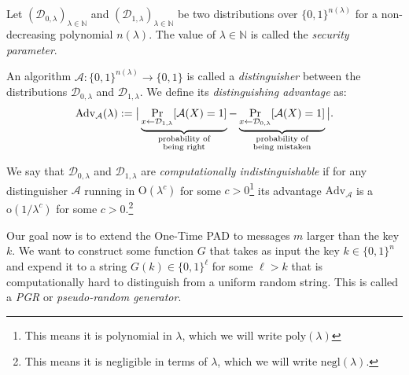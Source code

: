 \documentclass[./main]{subfiles}
\begin{document}
  \begin{defn}
    Let $(\mathcal{D}_{0, \lambda})_{\lambda \in \mathds{N}}$ and $(\mathcal{D}_{1, \lambda})_{\lambda \in \mathds{N}}$ be two distributions over $\{0,1\}^{n(\lambda)}$ for a non-decreasing polynomial $n(\lambda)$.
    The value of $\lambda \in \mathds{N}$ is called the \textit{security parameter}.

    An algorithm $\mathcal{A} : \{0,1\}^{n(\lambda)} \to \{0,1\}$ is called a \textit{distinguisher} between the distributions $\mathcal{D}_{0, \lambda}$ and $\mathcal{D}_{1, \lambda}$. We define its \textit{distinguishing advantage} as:
    \[
      \mathrm{Adv}_\mathcal{A}(\lambda) := \big| \underbrace{\Pr_{x \gets \mathcal{D}_{1, \lambda}} [\mathcal{A}(X) = 1]}_{ \mathclap{\substack{\text{probability of}\\ \text{being right}}} } - \underbrace{\Pr_{x \gets \mathcal{D}_{0, \lambda}} [\mathcal{A}(X) = 1]}_{\mathclap{\substack{\text{probability of}\\ \text{being mistaken}}}} \big|
    .\] 

    We say that $\mathcal{D}_{0, \lambda}$ and $\mathcal{D}_{1, \lambda}$ are \textit{computationally indistinguishable} if for any distinguisher $\mathcal{A}$ running in $\mathrm{O}(\lambda^c)$ for some $c > 0$\footnote{This means it is polynomial in $\lambda$, which we will write $\mathrm{poly}(\lambda)$} its advantage $\mathrm{Adv}_\mathcal{A}$ is a $\mathrm{o}(1 / \lambda^c)$ for some $c > 0$.\footnote{This means it is negligible in terms of $\lambda$, which we will write $\mathrm{negl}(\lambda)$.}
  \end{defn}
  
  Our goal now is to extend the One-Time PAD to messages $m$ larger than the key $k$.
  We want to construct some function $G$ that takes as input the key $k \in \{0,1\}^n$ and expend it to a string $G(k) \in \{0,1\}^\ell$  for some $\ell > k$ that is computationally hard to distinguish from a uniform random string.
  This is called a \textit{PGR} or \textit{pseudo-random generator}.
\end{document}
